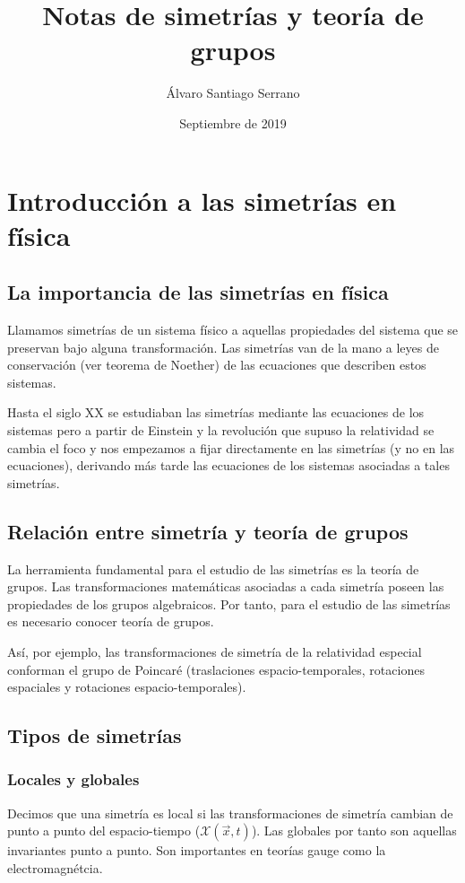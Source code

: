 \documentclass{article}
\title{Notas de simetrías y teoría de grupos}
\author{Álvaro Santiago Serrano }
\date{Septiembre de 2019}
\begin{document}
\maketitle

%
%
%
%
%
%
%
%
%
%
%
%
%
%
%
%


\section{Introducción a las simetrías en física}
\subsection{La importancia de las simetrías en física}

Llamamos simetrías de un sistema físico a aquellas propiedades del sistema que se preservan bajo alguna transformación. Las simetrías van de la mano a leyes de conservación (ver teorema de Noether) de las ecuaciones que describen estos sistemas.

Hasta el siglo XX se estudiaban las simetrías mediante las ecuaciones de los sistemas pero a partir de Einstein y la revolución que supuso la relatividad se cambia el foco y nos empezamos a fijar directamente en las simetrías (y no en las ecuaciones), derivando más tarde las ecuaciones de los sistemas asociadas a tales simetrías.

\subsection{Relación entre simetría y teoría de grupos}

La herramienta fundamental para el estudio de las simetrías es la teoría de grupos. Las transformaciones matemáticas asociadas a cada simetría poseen las propiedades de los grupos algebraicos. Por tanto, para el estudio de las simetrías es necesario conocer teoría de grupos.

\smallskip
Así, por ejemplo, las transformaciones de simetría de la relatividad especial conforman el grupo de Poincaré (traslaciones espacio-temporales, rotaciones espaciales y rotaciones espacio-temporales).

\subsection{Tipos de simetrías}

\subsubsection{Locales y globales}
Decimos que una simetría es local si las transformaciones de simetría cambian de punto a punto del espacio-tiempo ($\mathcal{X}(\Vec{x},t)$). Las globales por tanto son aquellas invariantes punto a punto. Son importantes en teorías gauge como la electromagnétcia.
\end{document}
